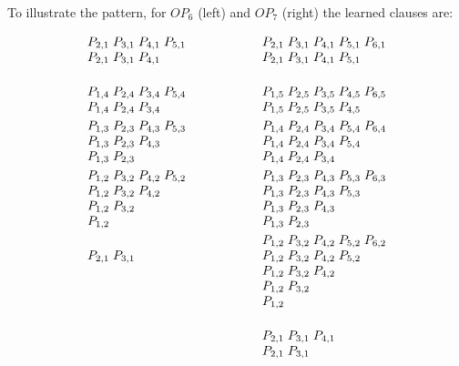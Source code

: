 \documentclass[a4paper,UKenglish,cleveref, autoref, thm-restate]{lipics-v2021}
\begin{document}
To illustrate the pattern, for $OP_6$ (left) and $OP_7$ (right) the learned clauses are:

\[
\makebox[\textwidth][c]{$ %
\begin{array}{@{}l@{\qquad \qquad \qquad}l@{}}
\begin{array}[t]{@{}l@{}}
P_{2,1}\;P_{3,1}\;P_{4,1}\;P_{5,1}\\
P_{2,1}\;P_{3,1}\;P_{4,1}\\[15pt]
P_{1,4}\;P_{2,4}\;P_{3,4}\;P_{5,4}\\
P_{1,4}\;P_{2,4}\;P_{3,4}\\[3pt]
P_{1,3}\;P_{2,3}\;P_{4,3}\;P_{5,3}\\
P_{1,3}\;P_{2,3}\;P_{4,3}\\
P_{1,3}\;P_{2,3}\\[3pt]
P_{1,2}\;P_{3,2}\;P_{4,2}\;P_{5,2}\\
P_{1,2}\;P_{3,2}\;P_{4,2}\\
P_{1,2}\;P_{3,2}\\
P_{1,2}\\[15pt]
P_{2,1}\;P_{3,1}
\end{array}
&
\begin{array}[t]{@{}l@{}}
P_{2,1}\;P_{3,1}\;P_{4,1}\;P_{5,1}\;P_{6,1}\\
P_{2,1}\;P_{3,1}\;P_{4,1}\;P_{5,1}\\[15pt]
P_{1,5}\;P_{2,5}\;P_{3,5}\;P_{4,5}\;P_{6,5}\\
P_{1,5}\;P_{2,5}\;P_{3,5}\;P_{4,5}\\[3pt]
P_{1,4}\;P_{2,4}\;P_{3,4}\;P_{5,4}\;P_{6,4}\\
P_{1,4}\;P_{2,4}\;P_{3,4}\;P_{5,4}\\
P_{1,4}\;P_{2,4}\;P_{3,4}\\[3pt]
P_{1,3}\;P_{2,3}\;P_{4,3}\;P_{5,3}\;P_{6,3}\\
P_{1,3}\;P_{2,3}\;P_{4,3}\;P_{5,3}\\
P_{1,3}\;P_{2,3}\;P_{4,3}\\
P_{1,3}\;P_{2,3}\\[3pt]
P_{1,2}\;P_{3,2}\;P_{4,2}\;P_{5,2}\;P_{6,2}\\
P_{1,2}\;P_{3,2}\;P_{4,2}\;P_{5,2}\\
P_{1,2}\;P_{3,2}\;P_{4,2}\\
P_{1,2}\;P_{3,2}\\
P_{1,2}\\[15pt]
P_{2,1}\;P_{3,1}\;P_{4,1}\\
P_{2,1}\;P_{3,1}
\end{array}
\end{array}
$} %
\]
\end{document}
